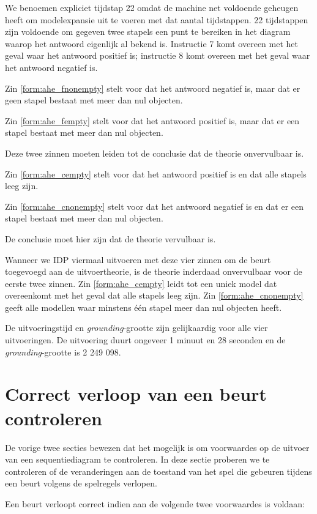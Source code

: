 We benoemen expliciet tijdstap 22 omdat de machine net voldoende geheugen heeft om modelexpansie uit te voeren met dat aantal tijdstappen. 22 tijdstappen zijn voldoende om gegeven twee stapels een punt te bereiken in het diagram waarop het antwoord eigenlijk al bekend is. Instructie 7 komt overeen met het geval waar het antwoord positief is; instructie 8 komt overeen met het geval waar het antwoord negatief is.

Zin \ref{form:ahe_fnonempty} stelt voor dat het antwoord negatief is, maar dat er geen stapel bestaat met meer dan nul objecten.

Zin \ref{form:ahe_fempty} stelt voor dat het antwoord positief is, maar dat er een stapel bestaat met meer dan nul objecten.

Deze twee zinnen moeten leiden tot de conclusie dat de theorie onvervulbaar is.

Zin \ref{form:ahe_cempty} stelt voor dat het antwoord positief is en dat alle stapels leeg zijn.

Zin \ref{form:ahe_cnonempty} stelt voor dat het antwoord negatief is en dat er een stapel bestaat met meer dan nul objecten.

De conclusie moet hier zijn dat de theorie vervulbaar is.

Wanneer we IDP viermaal uitvoeren met deze vier zinnen om de beurt toegevoegd aan de uitvoertheorie, is de theorie inderdaad onvervulbaar voor de eerste twee zinnen. Zin \ref{form:ahe_cempty} leidt tot een uniek model dat overeenkomt met het geval dat alle stapels leeg zijn. Zin \ref{form:ahe_cnonempty} geeft alle modellen waar minstens \'e\'en stapel meer dan nul objecten heeft.

De uitvoeringstijd en \textit{grounding}-grootte zijn gelijkaardig voor alle vier uitvoeringen. De uitvoering duurt ongeveer 1 minuut en 28 seconden en de \textit{grounding}-grootte is 2 249 098.

\section{Correct verloop van een beurt controleren}

De vorige twee secties bewezen dat het mogelijk is om voorwaardes op de uitvoer van een sequentiediagram te controleren. In deze sectie proberen we te controleren of de veranderingen aan de toestand van het spel die gebeuren tijdens een beurt volgens de spelregels verlopen.

Een beurt verloopt correct indien aan de volgende twee voorwaardes is voldaan:

